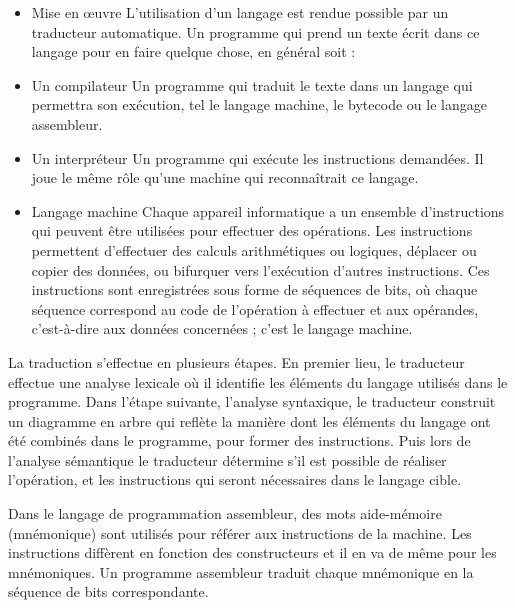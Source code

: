\documentclass[a4paper,12pt]{article}
\begin{document}
\begin{itemize}[label=\textbullet]

\setlength{\itemindent}{-1.5em}

\item Mise en œuvre
\newline L'utilisation d'un langage est rendue possible par un traducteur automatique. Un programme qui prend un texte écrit dans ce langage pour en faire quelque chose, en général soit :

\item Un compilateur
\newline Un programme qui traduit le texte dans un langage qui permettra son exécution, tel le langage machine, le bytecode ou le langage assembleur.

\item Un interpréteur
\newline Un programme qui exécute les instructions demandées. Il joue le même rôle qu'une machine qui reconnaîtrait ce langage.

\item Langage machine
\newline Chaque appareil informatique a un ensemble d'instructions qui peuvent être utilisées pour effectuer des opérations. Les instructions permettent d'effectuer des calculs arithmétiques ou logiques, déplacer ou copier des données, ou bifurquer vers l'exécution d'autres instructions. Ces instructions sont enregistrées sous forme de séquences de bits, où chaque séquence correspond au code de l'opération à effectuer et aux opérandes, c'est-à-dire aux données concernées ; c'est le langage machine\cite{godse}.

\end{itemize}

La traduction s'effectue en plusieurs étapes. En premier lieu, le traducteur effectue une analyse lexicale où il identifie les éléments du langage utilisés dans le programme. Dans l'étape suivante, l'analyse syntaxique, le traducteur construit un diagramme en arbre qui reflète la manière dont les éléments du langage ont été combinés dans le programme, pour former des instructions. Puis lors de l'analyse sémantique le traducteur détermine s'il est possible de réaliser l'opération, et les instructions qui seront nécessaires dans le langage cible\cite{dhamdhere}.

Dans le langage de programmation assembleur, des mots aide-mémoire (mnémonique) sont utilisés pour référer aux instructions de la machine. Les instructions diffèrent en fonction des constructeurs et il en va de même pour les mnémoniques. Un programme assembleur traduit chaque mnémonique en la séquence de bits correspondante\cite{tmh}.
\end{document}
